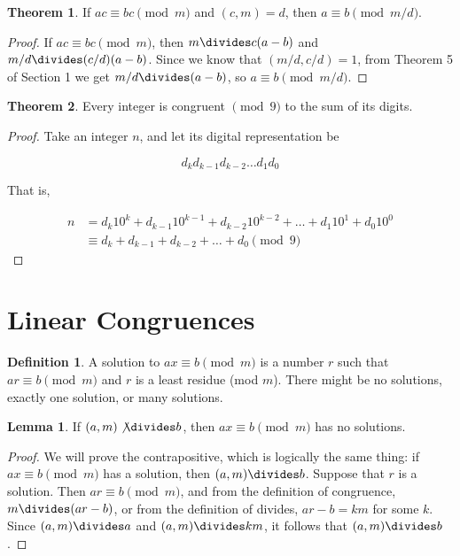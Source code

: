 \documentclass{article}
\theoremstyle{definition} %
\newtheorem{theorem}{Theorem}[section] %
\theoremstyle{definition}
\theoremstyle{definition}
\newtheorem{lemma}{Lemma}[section]
\theoremstyle{definition}
\newtheorem{definition}{Definition}[section]
\begin{document}
  \begin{theorem}
    If $ac \equiv bc \pmod{m}$ and $(c, m) = d$, then $a \equiv b \pmod{m/d}$.
  \end{theorem}
  
  \begin{proof}
    If $ac \equiv bc \pmod{m}$, then $m \divides c(a - b)$ and $m/d \divides (c/d)(a - b)$.
    Since we know that $(m/d, c/d) = 1$, from Theorem 5 of Section 1 we get $m/d \divides (a - b)$,
    so $a \equiv b \pmod{m/d}$.
  \end{proof}
  
  \begin{theorem}
    Every integer is congruent $\pmod{9}$ to the sum of its digits.
  \end{theorem}
  
  \begin{proof}
    Take an integer $n$, and let its digital representation be

    \[ d_kd_{k-1}d_{k-2}\dots d_1d_0 \]

    That is,
    
    \begin{align*}
      n &= d_k10^k + d_{k-1}10^{k-1} + d_{k-2}10^{k-2} + \dots + d_1 10^1 + d_0 10^0 \\
        &\equiv d_k + d_{k-1} + d_{k-2} + \dots + d_0 \pmod{9}
    \end{align*}
  \end{proof}
  
  \section{Linear Congruences}
  
  \begin{definition}
    A solution to $ax \equiv b \pmod{m}$ is a number $r$ such that $ar \equiv b \pmod{m}$
    and $r$ is a least residue (mod $m$). There might be no solutions, exactly one solution,
    or many solutions.
  \end{definition}
  
  \begin{lemma}
    If $(a, m) \not\divides b$, then $ax \equiv b \pmod{m}$ has no solutions.
  \end{lemma}
  
  \begin{proof}
    We will prove the contrapositive, which is logically the same thing: if $ax \equiv b \pmod{m}$
    has a solution, then $(a, m) \divides b$. Suppose that $r$ is a solution. Then $ar \equiv b \pmod{m}$,
    and from the definition of congruence, $m \divides (ar - b)$, or from the definition of divides,
    $ar - b = km$ for some $k$. Since $(a, m) \divides a$ and $(a, m) \divides km$, it follows that
    $(a, m) \divides b$.
  \end{proof}
  
\end{document}
